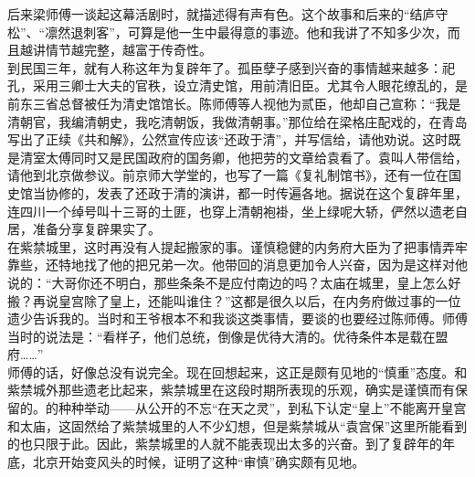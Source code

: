 后来梁师傅一谈起这幕活剧时，就描述得有声有色。这个故事和后来的“结庐守松”、“凛然退刺客”，可算是他一生中最得意的事迹。他和我讲了不知多少次，而且越讲情节越完整，越富于传奇性。\\

到民国三年，就有人称这年为复辟年了。孤臣孽子感到兴奋的事情越来越多：祀孔，采用三卿士大夫的官秩，设立清史馆，用前清旧臣。尤其令人眼花缭乱的，是前东三省总督被任为清史馆馆长。陈师傅等人视他为贰臣，他却自己宣称：“我是清朝官，我编清朝史，我吃清朝饭，我做清朝事。”那位给在梁格庄配戏的，在青岛写出了正续《共和解》，公然宣传应该“还政于清”，并写信给，请他劝说。这时既是清室太傅同时又是民国政府的国务卿，他把劳的文章给袁看了。袁叫人带信给，请他到北京做参议。前京师大学堂的，也写了一篇《复礼制馆书》，还有一位在国史馆当协修的，发表了还政于清的演讲，都一时传遍各地。据说在这个复辟年里，连四川一个绰号叫十三哥的土匪，也穿上清朝袍褂，坐上绿呢大轿，俨然以遗老自居，准备分享复辟果实了。\\

在紫禁城里，这时再没有人提起搬家的事。谨慎稳健的内务府大臣为了把事情弄牢靠些，还特地找了他的把兄弟一次。他带回的消息更加令人兴奋，因为是这样对他说的：“大哥你还不明白，那些条条不是应付南边的吗？太庙在城里，皇上怎么好搬？再说皇宫除了皇上，还能叫谁住？”这都是很久以后，在内务府做过事的一位遗少告诉我的。当时和王爷根本不和我谈这类事情，要谈的也要经过陈师傅。师傅当时的说法是：“看样子，他们总统，倒像是优待大清的。优待条件本是载在盟府……”\\

师傅的话，好像总没有说完全。现在回想起来，这正是颇有见地的“慎重”态度。和紫禁城外那些遗老比起来，紫禁城里在这段时期所表现的乐观，确实是谨慎而有保留的。的种种举动——从公开的不忘“在天之灵”，到私下认定“皇上”不能离开皇宫和太庙，这固然给了紫禁城里的人不少幻想，但是紫禁城从“袁宫保”这里所能看到的也只限于此。因此，紫禁城里的人就不能表现出太多的兴奋。到了复辟年的年底，北京开始变风头的时候，证明了这种“审慎”确实颇有见地。\\

